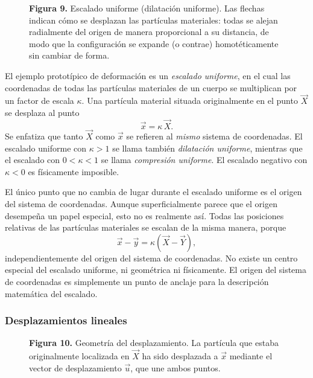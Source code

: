 \begin{figure}[H]
\centering

\par\medskip
\textbf{Figura 9.} Escalado uniforme (dilatación uniforme). Las flechas indican cómo se desplazan las partículas materiales: todas se alejan radialmente del origen de manera proporcional a su distancia, de modo que la configuración se expande (o contrae) homotéticamente sin cambiar de forma.
\end{figure}

El ejemplo prototípico de deformación es un \emph{escalado uniforme}, en el cual las coordenadas de todas las partículas materiales de un cuerpo se multiplican por un factor de escala $\kappa$. Una partícula material situada originalmente en el punto $\vec{X}$ se desplaza al punto
\[ \vec{x} = \kappa\,\vec{X}. \tag{66} \]
Se enfatiza que tanto $\vec{X}$ como $\vec{x}$ se refieren al \emph{mismo} sistema de coordenadas. El escalado uniforme con $\kappa > 1$ se llama también \emph{dilatación uniforme}, mientras que el escalado con $0 < \kappa < 1$ se llama \emph{compresión uniforme}. El escalado negativo con $\kappa < 0$ es físicamente imposible.

El único punto que no cambia de lugar durante el escalado uniforme es el origen del sistema de coordenadas. Aunque superficialmente parece que el origen desempeña un papel especial, esto no es realmente así. Todas las posiciones relativas de las partículas materiales se escalan de la misma manera, porque
\[ \vec{x} - \vec{y} = \kappa\left(\vec{X} - \vec{Y}\right), \tag{67} \]
independientemente del origen del sistema de coordenadas. No existe un centro especial del escalado uniforme, ni geométrica ni físicamente. El origen del sistema de coordenadas es simplemente un punto de anclaje para la descripción matemática del escalado.

\subsubsection{Desplazamientos lineales}

\begin{figure}[H]
\centering

\par\medskip
\textbf{Figura 10.} Geometría del desplazamiento. La partícula que estaba originalmente localizada en $\vec{X}$ ha sido desplazada a $\vec{x}$ mediante el vector de desplazamiento $\vec{u}$, que une ambos puntos.
\end{figure}

